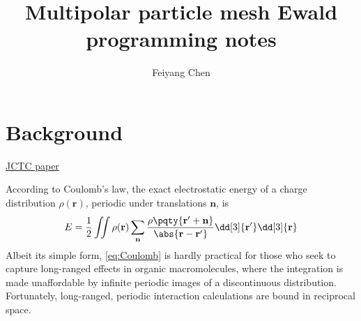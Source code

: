 \documentclass[12pt]{extarticle}
\title{Multipolar particle mesh Ewald programming notes}
\author{Feiyang Chen}
\renewcommand{\bf}{\mathbf}
\begin{document}
    \maketitle
    \section{Background}
    \href{https://pubs.acs.org/doi/pdf/10.1021/ct5007983}{JCTC paper}
    
    According to Coulomb's law, the exact electrostatic energy of a charge distribution \(\rho(\bf r)\), periodic under translations \(\bf n\), is  
    \begin{equation}
        E = \frac{1}{2} \iint \rho(\bf r) \sum_{\bf n} \frac{\rho \pqty{ \bf r' + \bf n}}{\abs{\bf r - \bf r'}} \dd[3]{\bf r'} \dd[3]{\bf r} \label{eq:Coulomb}
    \end{equation}
    Albeit its simple form, \cref{eq:Coulomb} is hardly practical for those who seek to capture long-ranged effects in organic macromolecules, where the integration is made unaffordable by infinite periodic images of a discontinuous distribution. Fortunately, long-ranged, periodic interaction calculations are bound in reciprocal space.
\end{document}
